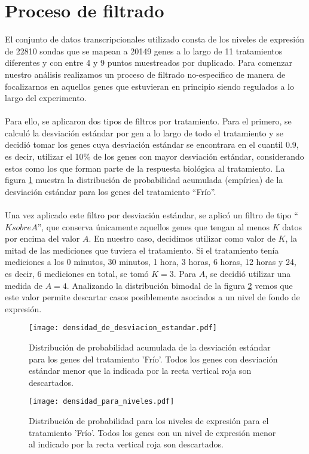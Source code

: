 \section{Proceso de filtrado}
El conjunto de datos transcripcionales utilizado consta de los niveles de expresión de 22810 sondas que se mapean a 20149 genes a lo largo de 11 tratamientos diferentes y con entre 4 y 9 puntos muestreados por duplicado. Para comenzar nuestro análisis realizamos un proceso de filtrado no-especifico de manera de focalizarnos en aquellos genes que estuvieran en principio siendo regulados a lo largo del experimento.\\\\
Para ello, se aplicaron dos tipos de filtros por tratamiento. Para el primero, se calculó la desviación estándar por gen a lo largo de todo el tratamiento y se decidió tomar los genes cuya desviación estándar se encontrara en el cuantil 0.9, es decir, utilizar el 10\% de los genes con mayor desviación estándar, considerando estos como los que forman parte de la respuesta biológica al tratamiento. La figura \ref{fig:densidad_de_desviacion_estandar} muestra la distribución de probabilidad acumulada (empírica) de la desviación estándar para los genes del tratamiento ``Frío''.\\\\
Una vez aplicado este filtro por desviación estándar, se aplicó un filtro de tipo ``$K sobre A$'', que conserva únicamente aquellos genes que tengan al menos $K$ datos por encima del valor $A$. En nuestro caso, decidimos utilizar como valor de $K$, la mitad de las mediciones que tuviera el tratamiento. Si el tratamiento tenía mediciones a los 0 minutos, 30 minutos, 1 hora, 3 horas, 6 horas, 12 horas y 24, es decir, 6 mediciones en total, se tomó $K = 3$. Para $A$, se decidió utilizar una medida de $A=4$. Analizando la distribución bimodal de la figura \ref{fig:densidad_para_niveles} vemos que este valor permite descartar casos posiblemente asociados a un nivel de fondo de expresión.
\begin{figure*}[t!]
    \centering
    \begin{subfigure}[t]{0.45\textwidth}
    \centering
    \texttt{[image: densidad\_de\_desviacion\_estandar.pdf]}
    \caption{Distribución de probabilidad acumulada de la desviación estándar para los genes del tratamiento 'Frío'. Todos los genes con desviación estándar menor que la indicada por la recta vertical roja son descartados.}
    \label{fig:densidad_de_desviacion_estandar}
    \end{subfigure}
    \begin{subfigure}[t]{0.45\textwidth}
    \centering
    \texttt{[image: densidad\_para\_niveles.pdf]}
    \caption{Distribución de probabilidad para los niveles de expresión para el tratamiento 'Frío'. Todos los genes con un nivel de expresión menor al indicado por la recta vertical roja son descartados.}
    \label{fig:densidad_para_niveles}
    \end{subfigure}
    \caption{Funciones de distribución de probabilidad para perfiles de expresión génica del tratamiento 'Frío'.}
\end{figure*}
